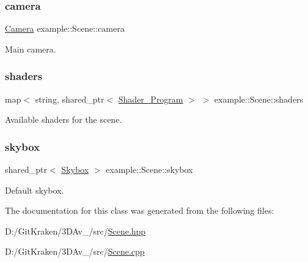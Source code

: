 \subsubsection{\texorpdfstring{camera}{camera}}
{\footnotesize\ttfamily \mbox{\hyperlink{classexample_1_1_camera}{Camera}} example\+::\+Scene\+::camera\hspace{0.3cm}{\ttfamily [protected]}}



Main camera. 

\mbox{\label{classexample_1_1_scene_af21081d9e0af2bbdd958a3fdf3460031}} 
\subsubsection{\texorpdfstring{shaders}{shaders}}
{\footnotesize\ttfamily map$<$ string, shared\+\_\+ptr$<$ \mbox{\hyperlink{classexample_1_1_shader___program}{Shader\+\_\+\+Program}} $>$ $>$ example\+::\+Scene\+::shaders\hspace{0.3cm}{\ttfamily [protected]}}



Available shaders for the scene. 

\mbox{\label{classexample_1_1_scene_ad20f50fcaf3d8deef29ddb83108185a2}} 
\subsubsection{\texorpdfstring{skybox}{skybox}}
{\footnotesize\ttfamily shared\+\_\+ptr$<$ \mbox{\hyperlink{classexample_1_1_skybox}{Skybox}} $>$ example\+::\+Scene\+::skybox\hspace{0.3cm}{\ttfamily [protected]}}



Default skybox. 



The documentation for this class was generated from the following files\+:\begin{DoxyCompactItemize}
\item 
D\+:/\+Git\+Kraken/3\+D\+Av\+\_/src/\mbox{\hyperlink{_scene_8hpp}{Scene.\+hpp}}\item 
D\+:/\+Git\+Kraken/3\+D\+Av\+\_/src/\mbox{\hyperlink{_scene_8cpp}{Scene.\+cpp}}\end{DoxyCompactItemize}
